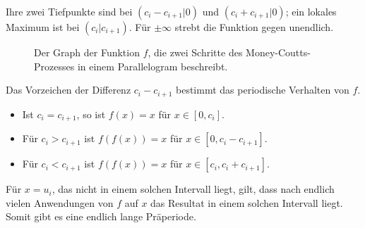Ihre zwei Tiefpunkte sind bei $(c_i-c_{i+1}|0)$ und $(c_i+c_{i+1}|0)$;
ein lokales Maximum ist bei $(c_i|c_{i+1})$.
Für $\pm\infty$ strebt die Funktion gegen unendlich.

\begin{figure}
    \caption{Der Graph der Funktion $f$, die zwei Schritte des Money-Coutts-Prozesses in einem Parallelogram beschreibt.}
    \label{parallogram:function}
\end{figure}

Das Vorzeichen der Differenz $c_i - c_{i+1}$ bestimmt das periodische Verhalten von $f$.
\begin{itemize}
    \item Ist $c_i=c_{i+1}$, so ist $f(x)=x$ für $x\in[0,c_i]$.
    \item Für $c_i>c_{i+1}$ ist $f(f(x))=x$ für $x\in[0,c_i-c_{i+1}]$.
    \item Für $c_i<c_{i+1}$ ist $f(f(x))=x$ für $x\in[c_i,c_i+c_{i+1}]$.
          \label{parallelogram:cases}
\end{itemize}

Für $x=u_i$, das nicht in einem solchen Intervall liegt, gilt,
dass nach endlich vielen Anwendungen von $f$ auf $x$ das Resultat in einem solchen Intervall liegt.
Somit gibt es eine endlich lange Präperiode.
